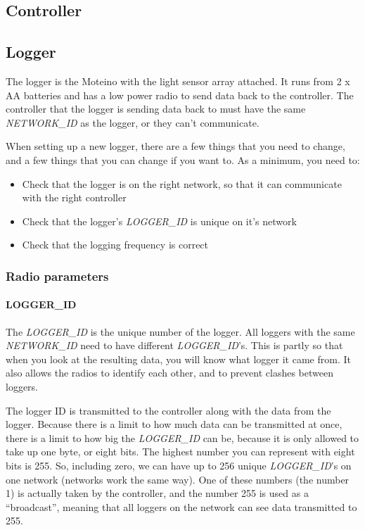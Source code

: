 \documentclass[10pt]{article}
\begin{document}
\subsection{Controller}

\subsection{Logger}
The logger is the Moteino with the light sensor array attached. It runs from 2 x AA batteries and has a low power radio to send data back to the controller. The controller
that the logger is sending data back to must have the same \textit{NETWORK\_ID} as the logger, or they can't communicate. \break

When setting up a new logger, there are a few things that you need to change, and a few things that you can change if you want to. As a minimum, you need to:

\begin{itemize}
 \item Check that the logger is on the right network, so that it can communicate with the right controller
 \item Check that the logger's \textit{LOGGER\_ID} is unique on it's network
 \item Check that the logging frequency is correct
\end{itemize}


\subsubsection{Radio parameters}

\paragraph{LOGGER\_ID}
The \textit{LOGGER\_ID} is the unique number of the logger. All loggers with the same \textit{NETWORK\_ID} need to have different \textit{LOGGER\_ID}'s. This is partly so 
that when you look at the resulting data, you will know what logger it came from. It also allows the radios to identify each other, and to prevent clashes between 
loggers. \break

The logger ID is transmitted to the controller along with the data from the logger. Because there is a limit to how much data can be transmitted at once, there is a limit
to how big the \textit{LOGGER\_ID} can be, because it is only allowed to take up one byte, or eight bits. The highest number you can represent with eight bits is 255. So,
including zero, we can have up to 256 unique \textit{LOGGER\_ID}'s on one network (networks work the same way). One of these numbers (the number 1) is actually taken by
the controller, and the number 255 is used as a ``broadcast'', meaning that all loggers on the network can see data transmitted to 255. \break
\end{document}

